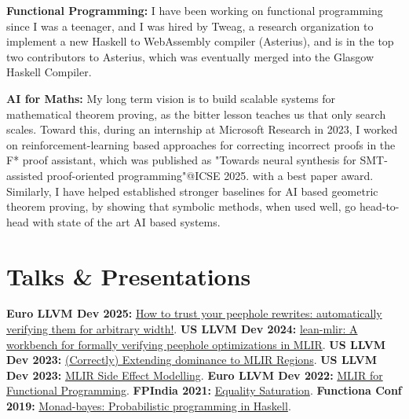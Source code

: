 \documentclass[11pt,a4paper,sans,colorlinks]{moderncv}        %
\begin{document}
\textbf{Functional Programming:} I have been working on functional programming since I was a teenager, and I was hired by Tweag, a research organization to implement a new Haskell to WebAssembly compiler (Asterius), and is in the top two contributors to Asterius, which was eventually merged into the Glasgow Haskell Compiler.

\textbf{AI for Maths:} My long term vision is to build scalable systems for mathematical theorem proving, as the bitter lesson teaches us that only search scales. Toward this, during an internship at Microsoft Research in 2023, I worked on reinforcement-learning based approaches for correcting incorrect proofs in the F* proof assistant, which was published as "Towards neural synthesis for SMT-assisted proof-oriented programming"@ICSE 2025. with a best paper award. Similarly, I have helped established stronger baselines for AI based geometric theorem proving, by showing that symbolic methods, when used well, go head-to-head with state of the art AI based systems.

\section{Talks \& Presentations}


\textbf{Euro LLVM Dev 2025:} \href{https://www.youtube.com/watch?v=WtsInfbzxjs}{How to trust your peephole rewrites: automatically verifying them for arbitrary width!}.
\textbf{US LLVM Dev 2024:} \href{https://www.youtube.com/watch?v=4lh2NnLOxvQ}{lean-mlir: A workbench for formally verifying peephole optimizations in MLIR}.
\textbf{US LLVM Dev 2023:} \href{https://www.youtube.com/watch?v=VJORFvHJKWE}{(Correctly) Extending dominance to MLIR Regions}.
\textbf{US LLVM Dev 2023:} \href{https://www.youtube.com/watch?v=6bDKasLZyxU}{MLIR Side Effect Modelling}.
\textbf{Euro LLVM Dev 2022:} \href{https://www.youtube.com/watch?v=cyMQbZ0B84Q}{MLIR for Functional Programming}.
\textbf{FPIndia 2021:} \href{https://www.youtube.com/watch?v=cfdII1jDJYU}{Equality Saturation}.
\textbf{Functiona Conf 2019:} \href{https://confengine.com/conferences/functional-conf-2019/proposals}{Monad-bayes: Probabilistic programming in Haskell}.



\end{document}
